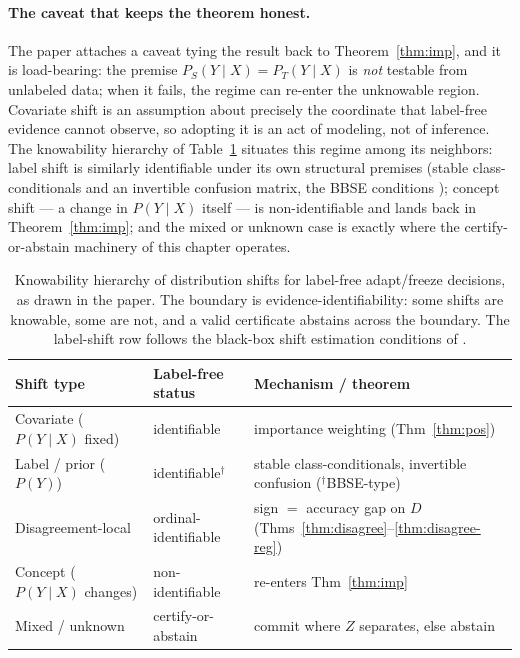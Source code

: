 \paragraph{The caveat that keeps the theorem honest.}
The paper attaches a caveat tying the result back to Theorem~\ref{thm:imp}, and it is
load-bearing: the premise $P_S(Y\mid X)=P_T(Y\mid X)$ is \emph{not} testable from
unlabeled data; when it fails, the regime can re-enter the unknowable region. Covariate
shift is an assumption about precisely the coordinate that label-free evidence cannot
observe, so adopting it is an act of modeling, not of inference. The knowability
hierarchy of Table~\ref{sec:t2-tab-shift} situates this regime among its neighbors:
label shift is similarly identifiable under its own structural premises (stable
class-conditionals and an invertible confusion matrix, the BBSE conditions
\cite{lipton2018detecting}); concept shift --- a change in $P(Y\mid X)$ itself --- is
non-identifiable and lands back in Theorem~\ref{thm:imp}; and the mixed or unknown case
is exactly where the certify-or-abstain machinery of this chapter operates.

\begin{table}[t]\centering\small
\begin{tabular}{lll}
\toprule
Shift type & Label-free status & Mechanism / theorem \\
\midrule
Covariate ($P(Y\!\mid\!X)$ fixed) & identifiable & importance weighting (Thm~\ref{thm:pos}) \\
Label / prior ($P(Y)$) & identifiable$^\dagger$ & stable class-conditionals, invertible confusion ($^\dagger$BBSE-type) \\
Disagreement-local & ordinal-identifiable & sign $=$ accuracy gap on $D$ (Thms~\ref{thm:disagree}--\ref{thm:disagree-reg}) \\
Concept ($P(Y\!\mid\!X)$ changes) & non-identifiable & re-enters Thm~\ref{thm:imp} \\
Mixed / unknown & certify-or-abstain & commit where $Z$ separates, else abstain \\
\bottomrule
\end{tabular}
\caption{Knowability hierarchy of distribution shifts for label-free adapt/freeze
decisions, as drawn in the paper. The boundary is evidence-identifiability: some shifts
are knowable, some are not, and a valid certificate abstains across the boundary. The
label-shift row follows the black-box shift estimation conditions of
\cite{lipton2018detecting}.}
\label{sec:t2-tab-shift}
\end{table}


